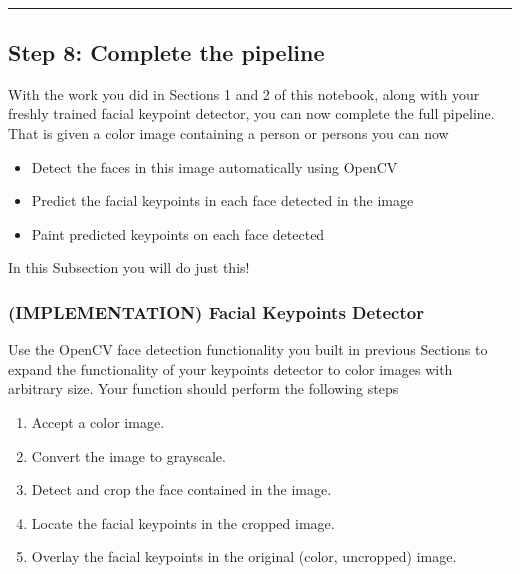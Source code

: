 \documentclass[11pt]{article}
\providecommand{\tightlist}{%
      \setlength{\itemsep}{0pt}\setlength{\parskip}{0pt}}
\begin{document}
    \begin{center}
    \end{center}
    { \hspace*{\fill} \\}
    
    \begin{center}\rule{0.5\linewidth}{\linethickness}\end{center}

\subsection{Step 8: Complete the
pipeline}\label{step-8-complete-the-pipeline}

With the work you did in Sections 1 and 2 of this notebook, along with
your freshly trained facial keypoint detector, you can now complete the
full pipeline. That is given a color image containing a person or
persons you can now

\begin{itemize}
\tightlist
\item
  Detect the faces in this image automatically using OpenCV
\item
  Predict the facial keypoints in each face detected in the image
\item
  Paint predicted keypoints on each face detected
\end{itemize}

In this Subsection you will do just this!

    \subsubsection{(IMPLEMENTATION) Facial Keypoints
Detector}\label{implementation-facial-keypoints-detector}

Use the OpenCV face detection functionality you built in previous
Sections to expand the functionality of your keypoints detector to color
images with arbitrary size. Your function should perform the following
steps

\begin{enumerate}
\def\labelenumi{\arabic{enumi}.}
\tightlist
\item
  Accept a color image.
\item
  Convert the image to grayscale.
\item
  Detect and crop the face contained in the image.
\item
  Locate the facial keypoints in the cropped image.
\item
  Overlay the facial keypoints in the original (color, uncropped) image.
\end{enumerate}
\end{document}
